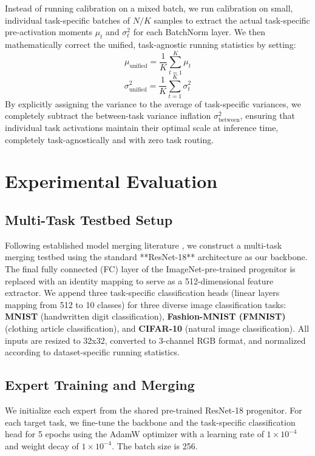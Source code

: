 \documentclass{article}
\theoremstyle{plain}
\theoremstyle{definition}
\theoremstyle{remark}
\begin{document}
Instead of running calibration on a mixed batch, we run calibration on small, individual task-specific batches of $N/K$ samples to extract the actual task-specific pre-activation moments $\mu_t$ and $\sigma^2_t$ for each BatchNorm layer. We then mathematically correct the unified, task-agnostic running statistics by setting:
\begin{equation}
    \mu_{\text{unified}} = \frac{1}{K} \sum_{t=1}^K \mu_t
\end{equation}
\begin{equation}
    \sigma^2_{\text{unified}} = \frac{1}{K} \sum_{t=1}^K \sigma^2_t
\end{equation}
By explicitly assigning the variance to the average of task-specific variances, we completely subtract the between-task variance inflation $\sigma^2_{\text{between}}$, ensuring that individual task activations maintain their optimal scale at inference time, completely task-agnostically and with zero task routing.

\vspace{-8pt}
\section{Experimental Evaluation}
\label{sec:experiments}

\subsection{Multi-Task Testbed Setup}
Following established model merging literature \cite{Jordan2023Repair, Anonymous2026Qcot}, we construct a multi-task merging testbed using the standard **ResNet-18** architecture as our backbone. The final fully connected (FC) layer of the ImageNet-pre-trained progenitor is replaced with an identity mapping to serve as a 512-dimensional feature extractor. We append three task-specific classification heads (linear layers mapping from 512 to 10 classes) for three diverse image classification tasks: \textbf{MNIST} (handwritten digit classification), \textbf{Fashion-MNIST (FMNIST)} (clothing article classification), and \textbf{CIFAR-10} (natural image classification). All inputs are resized to 32x32, converted to 3-channel RGB format, and normalized according to dataset-specific running statistics. 

\subsection{Expert Training and Merging}
We initialize each expert from the shared pre-trained ResNet-18 progenitor. For each target task, we fine-tune the backbone and the task-specific classification head for 5 epochs using the AdamW optimizer with a learning rate of $1 \times 10^{-4}$ and weight decay of $1 \times 10^{-4}$. The batch size is 256. 
\end{document}
